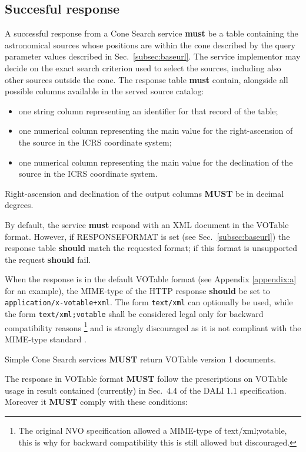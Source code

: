 \documentclass[11pt,a4paper]{ivoa}
\begin{document}
\subsection{Succesful response}
\label{subsec:response}

A successful response from a Cone Search service \textbf{must} be a
table containing the astronomical sources whose positions are within the
cone described by the query parameter values described in
Sec.~\ref{subsec:baseurl}. The service implementor may decide on the exact
search criterion used to select the sources, including also other
sources outside the cone.
The response table \textbf{must} contain, alongside all possible columns
available in the served source catalog:
\begin{itemize}
	\item one string column representing an identifier for that record of the table;
	\item one numerical column representing the main value for the
		right-ascension of the source in the ICRS coordinate system;
	\item one numerical column representing the main value for the
		declination of the source in the ICRS coordinate system.
\end{itemize}
Right-ascension and declination of the output columns \textbf{MUST} be in decimal degrees.

By default, the service \textbf{must} respond with an XML document in the
VOTable \citep{2025ivoa.spec.0116O} format. However, if RESPONSEFORMAT is
set (see Sec.~\ref{subsec:baseurl}) the response table \textbf{should}
match the requested format; if this format is unsupported the request
\textbf{should} fail.

When the response is in the default VOTable format (see Appendix \ref{appendix:a}
for an example), the MIME-type of the HTTP response \textbf{should} be
set to \texttt{application/x-votable+xml}. The form
\texttt{text/xml} can optionally be used, while the
form \texttt{text/xml;votable} shall be considered legal
only for backward compatibility reasons
\footnote{
	The original NVO specification allowed a MIME-type of text/xml;votable,
	this is why for backward compatibility this is still allowed but discouraged.
}
and is strongly discouraged as it is not compliant with the MIME-type
standard \citep{std:MIME}. 

Simple Cone Search services \textbf{MUST} return VOTable
version 1 documents.

The response in VOTable format \textbf{MUST} follow the prescriptions on
VOTable usage in result contained (currently) in Sec.~4.4 of the DALI 1.1
specification. Moreover it \textbf{MUST} comply with these conditions:
\end{document}
